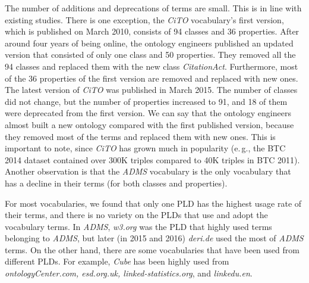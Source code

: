 The number of additions and deprecations of terms are small. 
This is in line with existing studies\cite{abdel2016qualitative, meusel2015web,guha2016schema}.
%
There is one exception, the \textit{CiTO} vocabulary's first version, which is published on March 2010, consists of 94 classes and 36 properties. After around four years of being online, the ontology engineers published an updated version that consisted of only one class and 50 properties.  They removed all the 94 classes and replaced them with the new class \textit{CitationAct}. Furthermore, most of the 36 properties of the first version are removed and replaced with new ones. The latest version of \textit{CiTO} was published in March 2015. The number of classes did not change, but the number of properties increased to 91, and 18 of them were deprecated from the first version.
We can say that the ontology engineers almost built a new ontology compared with the first published version, because they removed most of the terms and replaced them with new ones.
This is important to note, since \textit{CiTO} has grown much in popularity (e.\,g., the BTC 2014 dataset contained over 300K triples compared to 40K triples in BTC 2011).
%
Another observation is that the \textit{ADMS} vocabulary is the only vocabulary that has a decline in their terms (for both classes and properties). 




For most vocabularies, we found that only one PLD has the highest usage rate of their terms, and there is no variety on the PLDs that use and adopt the vocabulary terms.
In \textit{ADMS}, \textit{w3.org} was the PLD that highly used terms belonging to \textit{ADMS}, but later (in 2015 and 2016) \textit{deri.de} used the most of \textit{ADMS} terms. On the other hand, there are some vocabularies that have been used from different PLDs. For example, \textit{Cube} has been highly used from \textit{ontologyCenter.com, esd.org.uk, linked-statistics.org}, and \textit{linkedu.en}. 

